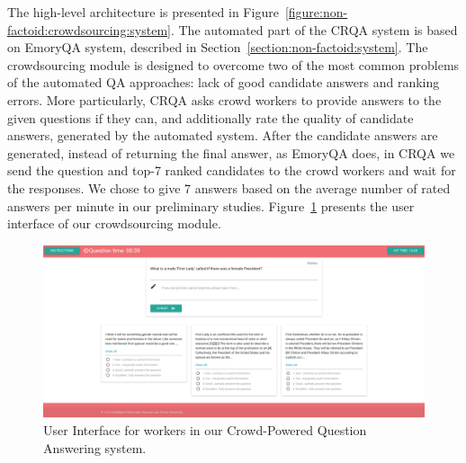 The high-level architecture is presented in Figure~\ref{figure:non-factoid:crowdsourcing:system}.
The automated part of the CRQA system is based on EmoryQA system, described in Section~\ref{section:non-factoid:system}.
The crowdsourcing module is designed to overcome two of the most common problems of the automated QA approaches: lack of good candidate answers and ranking errors.
More particularly, CRQA asks crowd workers to provide answers to the given questions if they can, and additionally rate the quality of candidate answers, generated by the automated system.
After the candidate answers are generated, instead of returning the final answer, as EmoryQA does, in CRQA we send the question and top-7 ranked candidates to the crowd workers and wait for the responses.
We chose to give 7 answers based on the average number of rated answers per minute in our preliminary studies.
Figure~\ref{figure:non-factoid:crowdsourcing:crowd_ui} presents the user interface of our crowdsourcing module.

\begin{figure}
    \centering
    \includegraphics[width=\textwidth]{img/crqa_crowd_ui}
    \caption{User Interface for workers in our Crowd-Powered Question Answering system.}
    \label{figure:non-factoid:crowdsourcing:crowd_ui}
\end{figure}

